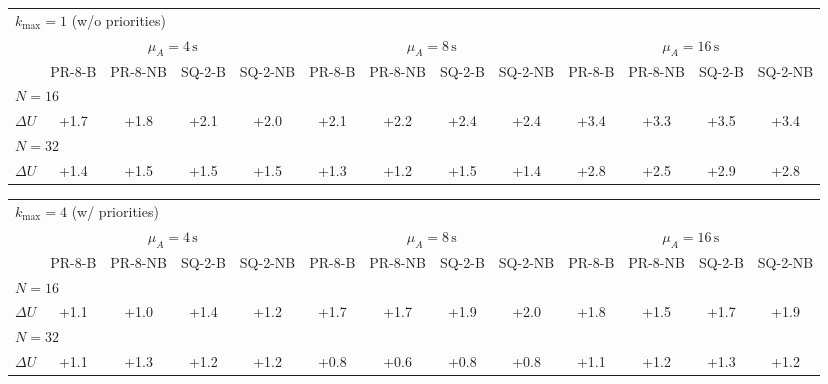 \begin{tabular}{l c c c c c c c c c c c c}
\toprule
\multicolumn{13}{l}{$k_{\max}=1$ (w/o priorities)} \\
\addlinespace[0.2em]
 & \multicolumn{4}{c}{$\mu_A=4\,\mathrm{s}$} & \multicolumn{4}{c}{$\mu_A=8\,\mathrm{s}$} & \multicolumn{4}{c}{$\mu_A=16\,\mathrm{s}$} \\
\cmidrule(lr){2-5}\cmidrule(lr){6-9}\cmidrule(lr){10-13}
 & PR-8-B & PR-8-NB & SQ-2-B & SQ-2-NB & PR-8-B & PR-8-NB & SQ-2-B & SQ-2-NB & PR-8-B & PR-8-NB & SQ-2-B & SQ-2-NB \\
\midrule
\multicolumn{13}{l}{${N=16}$} \\
\midrule
$\Delta U$ & +1.7 & +1.8 & +2.1 & +2.0 & +2.1 & +2.2 & +2.4 & +2.4 & +3.4 & +3.3 & +3.5 & +3.4 \\
\midrule
\multicolumn{13}{l}{${N=32}$} \\
\midrule
$\Delta U$ & +1.4 & +1.5 & +1.5 & +1.5 & +1.3 & +1.2 & +1.5 & +1.4 & +2.8 & +2.5 & +2.9 & +2.8 \\
\bottomrule
\end{tabular}

\begin{tabular}{l c c c c c c c c c c c c}
\toprule
\multicolumn{13}{l}{$k_{\max}=4$ (w/ priorities)} \\
\addlinespace[0.2em]
 & \multicolumn{4}{c}{$\mu_A=4\,\mathrm{s}$} & \multicolumn{4}{c}{$\mu_A=8\,\mathrm{s}$} & \multicolumn{4}{c}{$\mu_A=16\,\mathrm{s}$} \\
\cmidrule(lr){2-5}\cmidrule(lr){6-9}\cmidrule(lr){10-13}
 & PR-8-B & PR-8-NB & SQ-2-B & SQ-2-NB & PR-8-B & PR-8-NB & SQ-2-B & SQ-2-NB & PR-8-B & PR-8-NB & SQ-2-B & SQ-2-NB \\
\midrule
\multicolumn{13}{l}{${N=16}$} \\
\midrule
$\Delta U$ & +1.1 & +1.0 & +1.4 & +1.2 & +1.7 & +1.7 & +1.9 & +2.0 & +1.8 & +1.5 & +1.7 & +1.9 \\
\midrule
\multicolumn{13}{l}{${N=32}$} \\
\midrule
$\Delta U$ & +1.1 & +1.3 & +1.2 & +1.2 & +0.8 & +0.6 & +0.8 & +0.8 & +1.1 & +1.2 & +1.3 & +1.2 \\
\bottomrule
\end{tabular}
